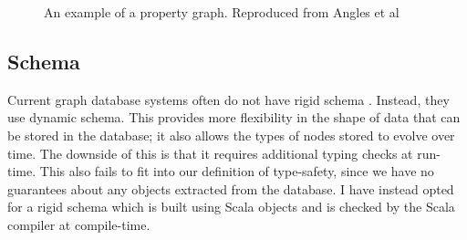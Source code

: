 \documentclass[12pt,a4paper,twoside,openright]{report}
\newcommand{\uri}[1]{\text{\scriptsize {\tt\vphantom{yI}#1}}}%
\newcommand{\urie}[1]{\uri{#1\,=\,}}
\newcommand{\uriq}[1]{\uri{#1}}%
\newcommand{\alt}[2]{
\addtolength{\jot}{-1ex} %
\begin{minipage}{#1} 
\vspace{2pt}
\begin{center}
$\begin{aligned}
#2
\end{aligned}$
\end{center}
\end{minipage}%
}
\begin{document}
\begin{figure}[ht]
\begin{center}


\end{center}
\caption{An example of a property graph. Reproduced from Angles et al \cite{PropertyGraphExample}}
  \label{fig:PropertyGraph}
\end{figure}



\subsection{Schema}
Current graph database systems often do not have rigid schema \cite{QueryLanguageSchema}. Instead, they use dynamic schema. This provides more flexibility in the shape of data that can be stored in the database; it also allows the types of nodes stored to evolve over time. The downside of this is that it requires additional typing checks at run-time. This also fails to fit into our definition of type-safety, since we have no guarantees about any objects extracted from the database. I have instead opted for a rigid schema which is built using Scala objects and is checked by the Scala compiler at compile-time.
\end{document}
